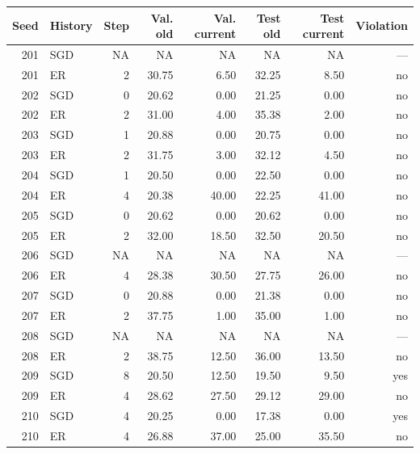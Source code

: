 \begin{tabular}{rlrrrrrr}
\toprule
Seed & History & Step & Val. old & Val. current & Test old & Test current & Violation \\
\midrule
201 & SGD & NA & NA & NA & NA & NA & --- \\
201 & ER & 2 & 30.75 & 6.50 & 32.25 & 8.50 & no \\
202 & SGD & 0 & 20.62 & 0.00 & 21.25 & 0.00 & no \\
202 & ER & 2 & 31.00 & 4.00 & 35.38 & 2.00 & no \\
203 & SGD & 1 & 20.88 & 0.00 & 20.75 & 0.00 & no \\
203 & ER & 2 & 31.75 & 3.00 & 32.12 & 4.50 & no \\
204 & SGD & 1 & 20.50 & 0.00 & 22.50 & 0.00 & no \\
204 & ER & 4 & 20.38 & 40.00 & 22.25 & 41.00 & no \\
205 & SGD & 0 & 20.62 & 0.00 & 20.62 & 0.00 & no \\
205 & ER & 2 & 32.00 & 18.50 & 32.50 & 20.50 & no \\
206 & SGD & NA & NA & NA & NA & NA & --- \\
206 & ER & 4 & 28.38 & 30.50 & 27.75 & 26.00 & no \\
207 & SGD & 0 & 20.88 & 0.00 & 21.38 & 0.00 & no \\
207 & ER & 2 & 37.75 & 1.00 & 35.00 & 1.00 & no \\
208 & SGD & NA & NA & NA & NA & NA & --- \\
208 & ER & 2 & 38.75 & 12.50 & 36.00 & 13.50 & no \\
209 & SGD & 8 & 20.50 & 12.50 & 19.50 & 9.50 & yes \\
209 & ER & 4 & 28.62 & 27.50 & 29.12 & 29.00 & no \\
210 & SGD & 4 & 20.25 & 0.00 & 17.38 & 0.00 & yes \\
210 & ER & 4 & 26.88 & 37.00 & 25.00 & 35.50 & no \\
\bottomrule
\end{tabular}
